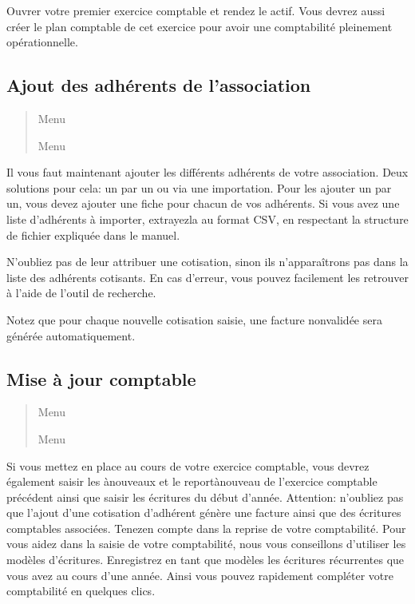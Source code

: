 \documentclass[a4paper,10pt,oneside,french]{sphinxmanual}
\begin{document}
Ouvrer votre premier exercice comptable et rendez le actif.
Vous devrez aussi créer le plan comptable de cet exercice pour avoir une comptabilité pleinement opérationnelle.


\subsection{Ajout des adhérents de l’association}
\label{\detokenize{asso/first_step:ajout-des-adherents-de-l-association}}\begin{quote}

Menu 

Menu 
\end{quote}

Il vous faut maintenant ajouter les différents adhérents de votre association.
Deux solutions pour cela: un par un ou via une importation.
Pour les ajouter un par un, vous devez ajouter une fiche pour chacun de vos adhérents.
Si vous avez une liste d’adhérents à importer, extrayez\sphinxhyphen{}la au format CSV, en respectant la structure de fichier expliquée dans le manuel.

N’oubliez pas de leur attribuer une cotisation, sinon ils n’apparaîtrons pas dans la liste des adhérents cotisants.
En cas d’erreur, vous pouvez facilement les retrouver à l’aide de l’outil de recherche.

Notez que pour chaque nouvelle cotisation saisie, une facture non\sphinxhyphen{}validée sera générée automatiquement.


\subsection{Mise à jour comptable}
\label{\detokenize{asso/first_step:mise-a-jour-comptable}}\begin{quote}

Menu 

Menu 
\end{quote}

Si vous mettez en place  au cours de votre exercice comptable, vous devrez également saisir les à\sphinxhyphen{}nouveaux et le report\sphinxhyphen{}à\sphinxhyphen{}nouveau de l’exercice comptable précédent ainsi que saisir les écritures du début d’année.
Attention: n’oubliez pas que l’ajout d’une cotisation d’adhérent génère une facture ainsi que des écritures comptables associées. Tenez\sphinxhyphen{}en compte dans la reprise de votre comptabilité.
Pour vous aidez dans la saisie de votre comptabilité, nous vous conseillons d’utiliser les modèles d’écritures. Enregistrez en tant que modèles les écritures récurrentes que vous avez au cours d’une année. Ainsi vous pouvez rapidement compléter votre comptabilité en quelques clics.
\end{document}

